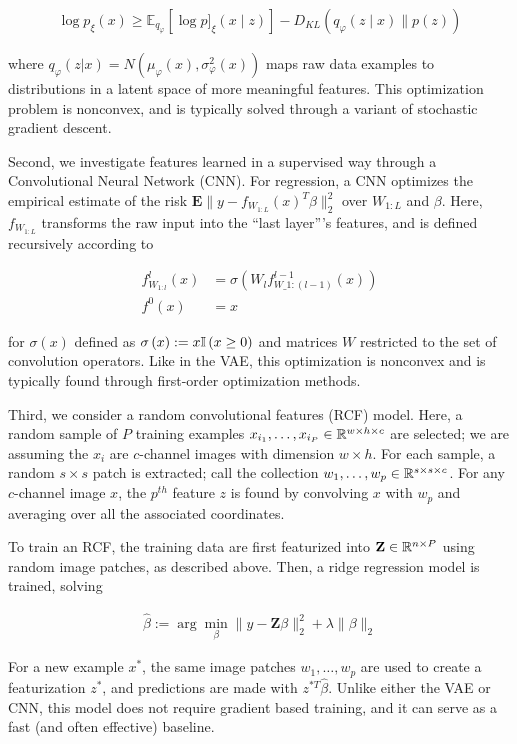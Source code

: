 \begin{align*}
\log p_{\xi}\left(x\right) \geq  \mathbb{E}_{q_{\varphi}}\left[\log p]_{\xi}(x \mid z)\right]-D_{KL}\left(q_{\varphi}(z \mid x) \| p(z)\right)
\end{align*}

where $q_{\varphi}\left(z \vert x\right) = N\left(\mu_{\varphi}\left(x\right), \sigma^{2}_{\varphi}\left(x\right)\right)$ maps raw data examples to distributions in a latent space of more meaningful features. This optimization problem is nonconvex, and is typically solved through a variant of stochastic gradient descent.

Second, we investigate features learned in a supervised way through a
Convolutional Neural Network (CNN). For regression, a CNN optimizes the
empirical estimate of the risk $\mathbf{E}\|y -
f_{W_{1:L}}\left(x\right)^{T}\beta\|_{2}^{2}$ over $W_{1:L}$ and $\beta$. Here,
$f_{W_{1:L}}$ transforms the raw input into the ``last layer''’s features, and
is defined recursively according to

\begin{align*}
f^{l}_{W_{1:l}}\left(x\right) &= \sigma\left(W_{l}f^{l - 1}_{W\_{1:(l - 1)}}\left(x\right)\right)\\
f^{0}\left(x\right) &= x
\end{align*}

for $\sigma\left(x\right)$ defined as $\sigma\left(x\right) := x \mathbb{I}\left({x \geq
  0}\right)$ and matrices $W$ restricted to the set of convolution operators. Like in
the VAE, this optimization is nonconvex and is typically found through
first-order optimization methods.

Third, we consider a random convolutional features (RCF) model. Here, a random
sample of $P$ training examples $x_{i_1}, \dots, x_{i_P} \in \mathbb{R}^{w \times h
  \times c}$ are selected; we are assuming the $x_{i}$ are $c$-channel images
with dimension $w\times h$. For each sample, a random $s \times s$ patch is
extracted; call the collection $w_{1}, \dots, w_{p} \in \mathbb{R}^{s \times s
  \times c}$. For any $c$-channel image $x$, the $p^{th}$ feature $z$ is found
by convolving $x$ with $w_{p}$ and averaging over all the associated
coordinates.

To train an RCF, the training data are first featurized into $\mathbf{Z} \in
\mathbb{R}^{n \times P}$ using random image patches, as described above. Then, a
ridge regression model is trained, solving

\begin{align*}
\hat{\beta} := \arg \min_{\beta} \|y - \mathbf{Z}\beta\|_{2}^{2} + \lambda \|\beta\|_{2}
\end{align*}

For a new example $x^{\ast}$, the same image patches $w_{1}, \dots, w_{p}$ are used to create a featurization $z^{\ast}$, and predictions are made with $z^{\ast T}\hat{\beta}$. Unlike either the VAE or CNN, this model does not require gradient based training, and it can serve as a fast (and often effective) baseline.
